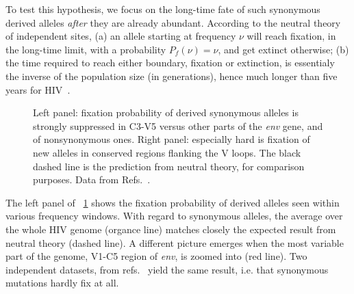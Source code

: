 \documentclass[12pt,a4paper,notitlepage,onecolumn]{article}
\newcommand{\env}{\textit{env}}
\begin{document}
To test this hypothesis, we focus on the long-time fate of such synonymous
derived alleles {\it after} they are already abundant. According to the neutral
theory of independent sites, (a) an allele starting at frequency $\nu$ will
reach fixation, in the long-time limit, with a probability $P_f(\nu) = \nu$, and
get extinct otherwise; (b) the time required to reach either boundary, fixation
or extinction, is essentialy the inverse of the population size (in
generations), hence much longer than five years for HIV~\citep{boltz_ultrasensitive_2012}.
\begin{figure}
\begin{center}
\caption{Left panel: fixation probability of derived synonymous alleles is strongly
suppressed in C3-V5 versus other parts of the {\it env} gene, and of
nonsynonymous ones.
Right panel: especially hard is fixation of new alleles in conserved regions flanking the V
loops. The black dashed line is the prediction from neutral
theory, for comparison purposes. Data from
Refs.~\cite{shankarappa_consistent_1999, bunnik_autologous_2008}.}
\label{fig:fixp}
\end{center}
\end{figure}

The left panel of \figurename~\ref{fig:fixp} shows the fixation probability of
derived alleles seen within various frequency windows. With regard to synonymous
alleles, the average over the whole HIV genome (organce line) matches closely
the expected result from neutral theory (dashed line). A different picture
emerges when the most variable part of the genome, V1-C5 region of \env{},
is zoomed into (red line). Two independent datasets, from
refs.~\citep{shankarappa_consistent_1999, bunnik_autologous_2008} yield the same
result, i.e. that synonymous mutations hardly fix at all.
\end{document}
